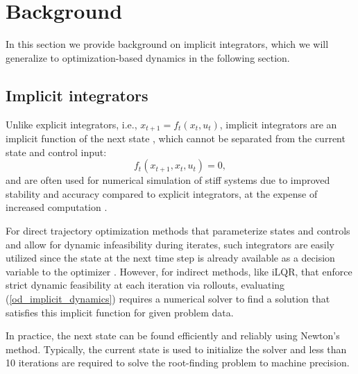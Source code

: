 \section{Background}\label{od_background}
In this section we provide background on implicit integrators, which we will generalize to optimization-based dynamics in the following section.

\subsection{Implicit integrators}    
Unlike explicit integrators, i.e., $x_{t+1} = f_t(x_t, u_t)$, implicit integrators are an implicit function of the next state \cite{brudigam2020linear, manchester2016quaternion}, which cannot be separated from the current state and control input:
\begin{equation}
	f_t(x_{t+1}, x_t, u_t) = 0, \label{od_implicit_dynamics}
\end{equation}
and are often used for numerical simulation of stiff systems due to improved stability and accuracy compared to explicit integrators, at the expense of increased computation \cite{wanner1996solving}.

For direct trajectory optimization methods that parameterize states and controls and allow for dynamic infeasibility during iterates, such integrators are easily utilized since the state at the next time step is already available as a decision variable to the optimizer \cite{stryk1993numerical}. However, for indirect methods, like iLQR, that enforce strict dynamic feasibility at each iteration via rollouts, evaluating (\ref{od_implicit_dynamics}) requires a numerical solver to find a solution that satisfies this implicit function for given problem data.

In practice, the next state can be found efficiently and reliably using Newton's method. Typically, the current state is used to initialize the solver and less than 10 iterations are required to solve the root-finding problem to machine precision.

